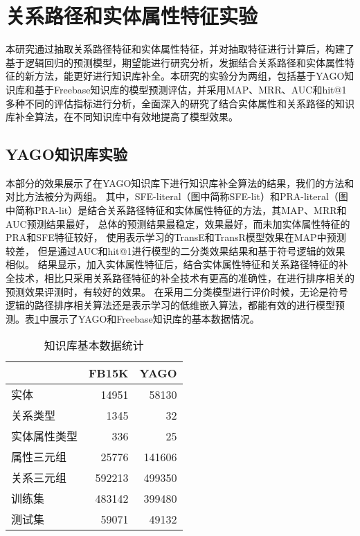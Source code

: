 \section{关系路径和实体属性特征实验}
本研究通过抽取关系路径特征和实体属性特征，并对抽取特征进行计算后，构建了基于逻辑回归的预测模型，期望能进行研究分析，发掘结合关系路径和实体属性特征的新方法，能更好进行知识库补全。本研究的实验分为两组，包括基于YAGO知识库和基于Freebase知识库的模型预测评估，并采用MAP、MRR、AUC和hit@1多种不同的评估指标进行分析，全面深入的研究了结合实体属性和关系路径的知识库补全算法，在不同知识库中有效地提高了模型效果。
\subsection{YAGO知识库实验}
\label{cha:exp-literal}
本部分的效果展示了在YAGO知识库下进行知识库补全算法的结果，我们的方法和对比方法被分为两组。
其中，SFE-literal（图中简称SFE-lit）和PRA-literal（图中简称PRA-lit）是结合关系路径特征和实体属性特征的方法，其MAP、MRR和AUC预测结果最好，
总体的预测结果最稳定，效果最好，而未加实体属性特征的PRA和SFE特征较好，
使用表示学习的TransE和TransR模型效果在MAP中预测较差，
但是通过AUC和hit@1进行模型的二分类效果结果和基于符号逻辑的效果相似。
结果显示，加入实体属性特征后，结合实体属性特征和关系路径特征的补全技术，相比只采用关系路径特征的补全技术有更高的准确性，在进行排序相关的预测效果评测时，有较好的效果。
在采用二分类模型进行评价时候，无论是符号逻辑的路径排序相关算法还是表示学习的低维嵌入算法，都能有效的进行模型预测。表\ref{tab:addlabel-kbcExp-data}中展示了YAGO和Freebase知识库的基本数据情况。

\begin{table}[htbp]
  \centering
  \caption{知识库基本数据统计}
    \begin{tabular}{|l|r|r|}
    \hline
    \textcolor[rgb]{ .141,  .161,  .18}{} & \multicolumn{1}{l|}{FB15K} & \multicolumn{1}{l|}{YAGO} \\
    \hline
    实体    & 14951 & 58130 \\
    \hline
    关系类型  & 1345  & 32 \\
    \hline
    实体属性类型 & 336   & 25 \\
    \hline
    属性三元组 & 25776 & 141606 \\
    \hline
    关系三元组 & 592213 & 499350 \\
    \hline
    训练集   & 483142 & 399480 \\
    \hline
    测试集   & 59071 & 49132 \\
    \hline
    \end{tabular}%
  \label{tab:addlabel-kbcExp-data}%
\end{table}%

